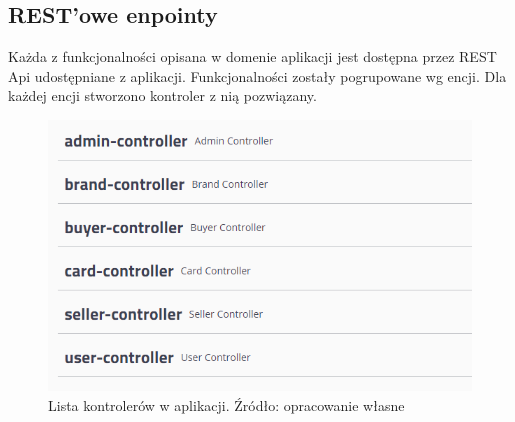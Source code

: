 \subsection{REST'owe enpointy}
Każda z funkcjonalności opisana w domenie aplikacji jest dostępna przez REST Api udostępniane z aplikacji. Funkcjonalności zostały pogrupowane wg encji. Dla każdej encji stworzono kontroler z nią pozwiązany.

\begin{figure}[h!]
  \centering
    \includegraphics[width=1.0\textwidth]{images/controllerlist.PNG}
  \caption{Lista kontrolerów w aplikacji. Źródło: opracowanie własne }
\end{figure}
\FloatBarrier


